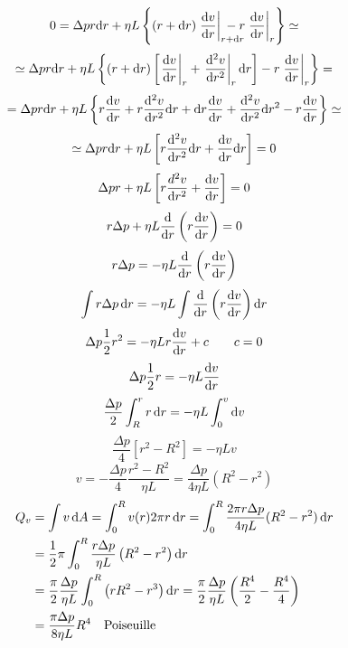 \begin{equation*}0=\Delta p r\ud r+\eta L\left\{(r+\ud r)\left.\frac{\ud v}{\ud r}\right|_{r+\ud r}\!\!\!\!\!\!\!\!\!\!-r\left.\frac{\ud v}{\ud r}\right|_r\right\}\simeq\end{equation*}
\begin{equation*}\simeq\Delta p r\mathrm{d} r+\eta L\left\{(r+\mathrm{d} r)\left[\left.\frac{\mathrm{d} v}{\mathrm{d} r}\right|_r+\left.\frac{\mathrm{d}^2 v}{\mathrm{d} r^2}\right|_r\mathrm{d} r\right]-r\left.\frac{\mathrm{d} v}{\mathrm{d} r}\right|_r\right\}=\end{equation*}
\begin{equation*}=\Delta p r\mathrm{d} r+\eta L\left\{r\frac{\mathrm{d} v}{\mathrm{d} r}+r\frac{\mathrm{d}^2 v}{\mathrm{d} r^2}\mathrm{d} r+\mathrm{d} r\frac{\mathrm{d} v}{\mathrm{d} r}+\frac{\mathrm{d}^2 v}{\mathrm{d} r^2}\mathrm{d} r^2-r\frac{\mathrm{d} v}{\mathrm{d} r}\right\}\simeq\end{equation*}
\begin{equation*}\simeq\Delta p r \mathrm{d} r+\eta L\left[r\frac{\mathrm{d}^2 v}{\mathrm{d} r^2}\mathrm{d} r+\frac{\mathrm{d} v}{\mathrm{d} r}\mathrm{d} r\right]=0\end{equation*}
\begin{equation*}\Delta p r+\eta L\left[r\frac{d^2 v}{\mathrm{d} r^2}+\frac{\mathrm{d} v}{\mathrm{d} r}\right]=0\end{equation*}
\begin{equation*}r\Delta p+\eta L\frac{\mathrm{d}}{\mathrm{d} r}\left(r \frac{\mathrm{d} v}{\mathrm{d} r}\right)=0\end{equation*}
\begin{equation*}r\Delta p=-\eta L\frac{\mathrm{d}}{\mathrm{d} r}\left(r\frac{\mathrm{d} v}{\mathrm{d} r}\right)\end{equation*}
\begin{equation*}\int r\Delta p\,\mathrm{d} r=-\eta L\int\frac{\mathrm{d}}{\mathrm{d} r}\left(r\frac{\mathrm{d} v}{\mathrm{d} r}\right)\mathrm{d} r\end{equation*}
\begin{equation*}\Delta p\frac{1}{2}r^2=-\eta L r\frac{\mathrm{d} v}{\mathrm{d} r}+c\qquad c=0\end{equation*}
\begin{equation*}\Delta p\frac{1}{2}r=-\eta L \frac{\mathrm{d} v}{\mathrm{d} r}\end{equation*}
\begin{equation*}\frac{\Delta p}{2}\int_R^r r\,\mathrm{d} r=-\eta L\int_0^v \mathrm{d} v\end{equation*}
\begin{equation*}\frac{\Delta p}{4}\left[r^2-R^2\right]=-\eta Lv\end{equation*}
\begin{equation*}v=-\frac{\Delta p}{4}\frac{r^2-R^2}{\eta L}=\frac{\Delta p}{4\eta L}\left(R^2-r^2\right)\end{equation*}
\begin{align*}
Q_v&=\int v \,\mathrm{d} A=\int_0^R v(r)2\pi r\,\mathrm{d} r=\int_0^R\frac{2\pi r\Delta p}{4\eta L}(R^2-r^2)\,\mathrm{d} r\\
&=\frac{1}{2}\pi\int_0^R\frac{r\Delta p}{\eta L}\left(R^2-r^2\right)\mathrm{d} r\\
&=\frac{\pi}{2}\frac{\Delta p}{\eta L}\int_0^R \left(rR^2-r^3\right)\mathrm{d} r=\frac{\pi}{2}\frac{\Delta p}{\eta L}\left(\frac{R^4}{2}-\frac{R^4}{4}\right)\\
&=\frac{\pi\Delta p}{8\eta L}R^4\quad\text{Poiseuille}
\end{align*}


